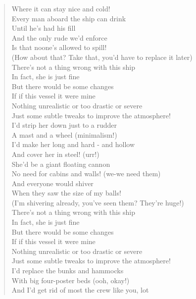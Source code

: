 \documentclass[11pt]{article}
\begin{document}
\begin{verse}
Where it can stay nice and cold!\\
Every man aboard the ship can drink\\
Until he's had his fill\\
And the only rude we'd enforce\\
Is that noone's allowed to spill!\\
(How about that? Take that, you'd have to replace it later)\\
\vspace*{1em}
There's not a thing wrong with this ship\\
In fact, she is just fine\\
But there would be some changes\\
If if this vessel it were mine\\
Nothing unrealistic or too drastic or severe\\
Just some subtle tweaks to improve the atmosphere!\\
\vspace*{1em}
I'd strip her down just to a rudder\\
A mast and a wheel (minimalism!)\\
I'd make her long and hard - and hollow\\
And cover her in steel! (urr!)\\
She'd be a giant floating cannon\\
No need for cabins and walls! (we-we need them)\\
And everyone would shiver\\
When they saw the size of my balls!\\
(I'm shivering already, you've seen them? They're huge!)\\
\vspace*{1em}
There's not a thing wrong with this ship\\
In fact, she is just fine\\
But there would be some changes\\
If if this vessel it were mine\\
Nothing unrealistic or too drastic or severe\\
Just some subtle tweaks to improve the atmosphere!\\
\vspace*{1em}
I'd replace the bunks and hammocks\\
With big four-poster beds (ooh, okay!)\\
And I'd get rid of most the crew like you, lot\\

\end{verse}
\end{document}
